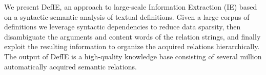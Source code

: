 We present DefIE, an approach to large-scale Information Extraction (IE) based on a syntactic-semantic analysis of textual definitions. Given a large corpus of definitions we leverage syntactic dependencies to reduce data sparsity, then disambiguate the arguments and content words of the relation strings, and finally exploit the resulting information to organize the acquired relations hierarchically. The output of DefIE is a high-quality knowledge base consisting of several million automatically acquired semantic relations.
